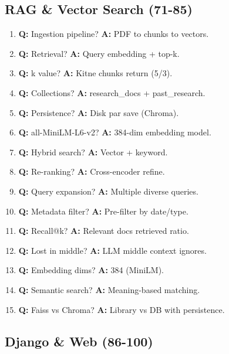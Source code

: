 \subsection{RAG \& Vector Search (71-85)}

\begin{enumerate}[label=\arabic*.]
\item \textbf{Q:} Ingestion pipeline? \textbf{A:} PDF to chunks to vectors.
\item \textbf{Q:} Retrieval? \textbf{A:} Query embedding + top-k.
\item \textbf{Q:} k value? \textbf{A:} Kitne chunks return (5/3).
\item \textbf{Q:} Collections? \textbf{A:} research\_docs + past\_research.
\item \textbf{Q:} Persistence? \textbf{A:} Disk par save (Chroma).
\item \textbf{Q:} all-MiniLM-L6-v2? \textbf{A:} 384-dim embedding model.
\item \textbf{Q:} Hybrid search? \textbf{A:} Vector + keyword.
\item \textbf{Q:} Re-ranking? \textbf{A:} Cross-encoder refine.
\item \textbf{Q:} Query expansion? \textbf{A:} Multiple diverse queries.
\item \textbf{Q:} Metadata filter? \textbf{A:} Pre-filter by date/type.
\item \textbf{Q:} Recall@k? \textbf{A:} Relevant docs retrieved ratio.
\item \textbf{Q:} Lost in middle? \textbf{A:} LLM middle context ignores.
\item \textbf{Q:} Embedding dims? \textbf{A:} 384 (MiniLM).
\item \textbf{Q:} Semantic search? \textbf{A:} Meaning-based matching.
\item \textbf{Q:} Faiss vs Chroma? \textbf{A:} Library vs DB with persistence.
\end{enumerate}

\subsection{Django \& Web (86-100)}

